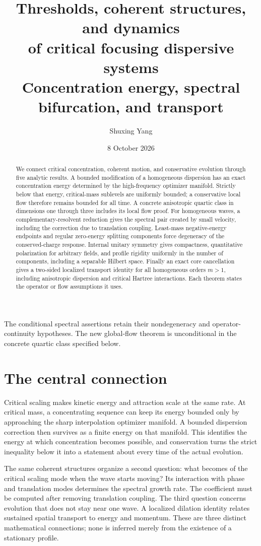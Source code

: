 \documentclass[11pt,a4paper]{article}
\title{Thresholds, coherent structures, and dynamics\\of critical focusing dispersive systems\\[5pt]
\large Concentration energy, spectral bifurcation, and transport}
\author{Shuxing Yang}
\date{8 October 2026}
\theoremstyle{remark}\newtheorem{remark}[theorem]{Remark}
\begin{document}
\maketitle
\begin{abstract}
We connect critical concentration, coherent motion, and conservative
evolution through five analytic results. A bounded modification of a
homogeneous dispersion has an exact concentration energy determined by
the high-frequency optimizer manifold. Strictly below that energy,
critical-mass sublevels are uniformly bounded; a conservative local flow
therefore remains bounded for all time. A concrete anisotropic quartic
class in dimensions one through three includes its local flow proof.
For homogeneous waves, a complementary-resolvent reduction gives the
spectral pair created by small velocity, including the correction due to
translation coupling. Least-mass negative-energy endpoints and regular
zero-energy splitting components force degeneracy of the conserved-charge
response. Internal unitary symmetry gives compactness, quantitative
polarization for arbitrary fields, and profile rigidity uniformly in the
number of components, including a separable Hilbert space. Finally an
exact core cancellation gives a two-sided
localized transport identity for all homogeneous orders $m>1$, including
anisotropic dispersion and critical Hartree interactions. Each theorem
states the operator or flow assumptions it uses.
\end{abstract}

The conditional spectral assertions retain their
nondegeneracy and operator-continuity hypotheses. The new global-flow
theorem is unconditional in the concrete quartic class specified below.


\section*{The central connection}
Critical scaling makes kinetic energy and attraction scale at the same
rate. At critical mass, a concentrating sequence can keep its energy
bounded only by approaching the sharp interpolation optimizer manifold.
A bounded dispersion correction then survives as a finite energy on that
manifold. This identifies the energy at which concentration becomes
possible, and conservation turns the strict inequality below it into a
statement about every time of the actual evolution.

The same coherent structures organize a second question: what becomes
of the critical scaling mode when the wave starts moving? Its interaction
with phase and translation modes determines the spectral growth rate.
The coefficient must be computed after removing translation coupling.
The third question concerns evolution that does not stay near one wave.
A localized dilation identity relates sustained spatial transport to
energy and momentum. These are three distinct mathematical connections;
none is inferred merely from the existence of a stationary profile.
\end{document}
